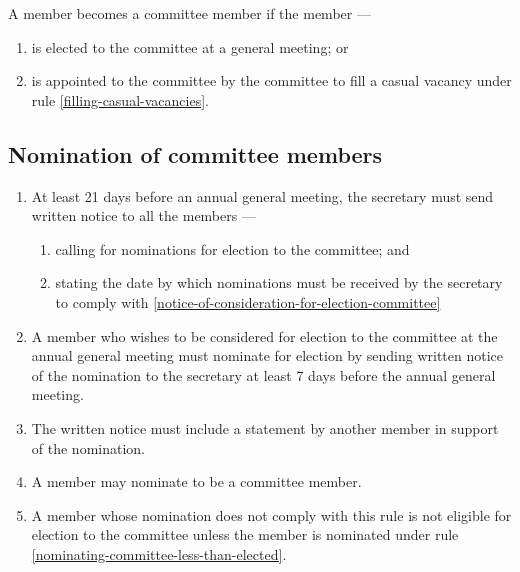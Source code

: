 \documentclass[../constitution.tex]{subfiles}
\begin{document}
A member becomes a committee member if the member ---

\begin{enumerate}

\item is elected to the committee at a general meeting; or
\item is appointed to the committee by the committee to fill a casual vacancy under rule \ref{filling-casual-vacancies}.
\end{enumerate}

\hypertarget{nomination-of-committee-members}{%
\subsection{Nomination of committee members}\label{nomination-of-committee-members}}

\begin{enumerate}

\item At least 21  days before an annual general meeting, the secretary must send written notice to all the members ---

  \begin{enumerate}
  
  \item calling for nominations for election to the committee; and
  \item stating the date by which nominations must be received by the secretary to comply with  \ref{notice-of-consideration-for-election-committee}
  \end{enumerate}
\item A member who wishes to be considered for election to the committee at the annual general meeting must nominate for election by sending written notice of the nomination to the secretary at least 7  days before the annual general meeting.  \label{notice-of-consideration-for-election-committee}
\item The written notice must include a statement by another member in support of the nomination.
\item A member may nominate to be a committee member. 
\item A member whose nomination does not comply with this rule is not eligible for election to the committee unless the member is nominated under rule \ref{nominating-committee-less-than-elected}.  
\end{enumerate}
\end{document}
